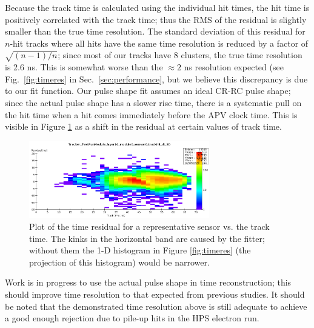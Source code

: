 Because the track time is calculated using the individual hit times, the hit time is positively correlated 
with the track time; thus the RMS of the residual is slightly smaller than the true time resolution.
The standard deviation of this residual for $n$-hit tracks where all hits have the same time resolution 
is reduced by a factor of $\sqrt{(n-1)/n}$; since most of our tracks have 8 clusters, the true time 
resolution is 2.6 ns. 
This is somewhat worse than the $\approx 2$ ns resolution expected (see Fig.~\ref{fig:timeres} in 
Sec.~\ref{sec:performance}, but we believe this discrepancy is due to our fit function. Our pulse 
shape fit assumes an ideal CR-RC pulse shape; since the actual pulse shape has a slower rise time, 
there is a systematic pull on the hit time when a hit comes immediately before the APV clock time. 
This is visible in Figure \ref{fig:timeres_2D} as a shift in the residual at certain values of track time.
\begin{figure}[]
	\includegraphics[width=0.7\textwidth]{test2012/svtperformance/timeres_2D}
	\caption{\small{Plot of the time residual for a representative sensor vs. the track time. 
		The kinks in the horizontal band are caused by the fitter; without them the 1-D histogram in Figure \ref{fig:timeres} (the projection of this histogram) would be narrower.} }
	\label{fig:timeres_2D}
\end{figure}
Work is in progress to use the actual pulse shape in time reconstruction; this should improve time resolution to that expected from previous studies. 
It should be noted that the demonstrated time resolution above is still adequate to achieve a good 
enough rejection due to pile-up hits in the HPS electron run. 




